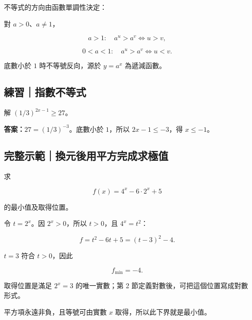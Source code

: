 \documentclass[11pt,a4paper]{article}
\begin{document}
不等式的方向由函數單調性決定：

對 \(a>0\)、\(a\ne1\)，

\[
a>1:\quad a^u>a^v\iff u>v,
\]

\[
0<a<1:\quad a^u>a^v\iff u<v.
\]

底數小於 \(1\) 時不等號反向，源於 \(y=a^x\) 為遞減函數。

\begin{HandoutSelfCheck}

\subsection{練習｜指數不等式}\label{ux7df4ux7fd2ux6307ux6578ux4e0dux7b49ux5f0f}

解 \((1/3)^{2x-1}\ge27\)。

\textbf{答案：}\(27=(1/3)^{-3}\)。底數小於 \(1\)，所以 \(2x-1\le-3\)，得 \(\boxed{x\le-1}\)。

\end{HandoutSelfCheck}

\begin{HandoutWorkedExample}

\subsection{完整示範｜換元後用平方完成求極值}\label{ux5b8cux6574ux793aux7bc4ux63dbux5143ux5f8cux7528ux5e73ux65b9ux5b8cux6210ux6c42ux6975ux503c}

求

\[
f(x)=4^x-6\cdot2^x+5
\]

的最小值及取得位置。

令 \(t=2^x\)。因 \(2^x>0\)，所以 \(t>0\)，且 \(4^x=t^2\)：

\[
f=t^2-6t+5=(t-3)^2-4.
\]

\(t=3\) 符合 \(t>0\)，因此

\[
\boxed{f_{\min}=-4}.
\]

取得位置是滿足 \(\boxed{2^x=3}\) 的唯一實數；第 2 節定義對數後，可把這個位置寫成對數形式。

平方項永遠非負，且等號可由實數 \(x\) 取得，所以此下界就是最小值。

\end{HandoutWorkedExample}
\end{document}
